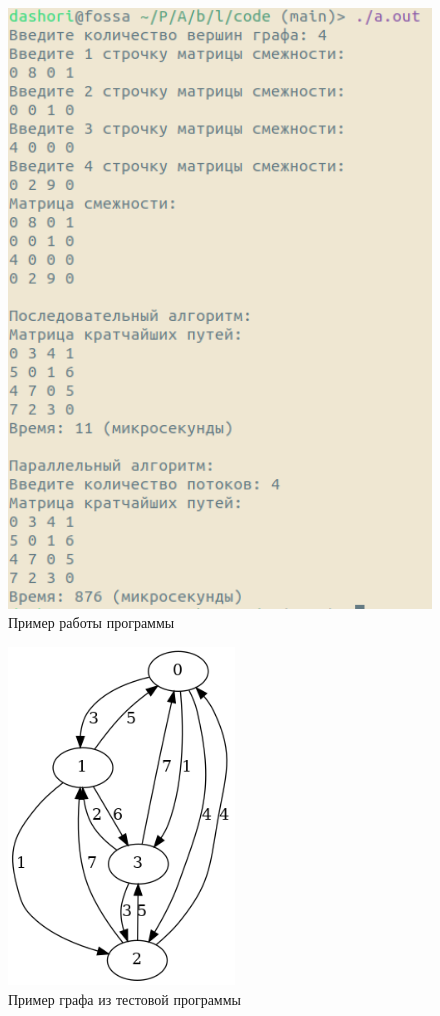 \begin{figure}[H]
	\centering
	\includegraphics[width=130mm]{images/example}
	\caption{Пример работы программы}
	\label{img:example}
\end{figure}
\begin{figure}[H]
	\centering
	\includegraphics[width=60mm]{images/exampleGraph.png}
	\caption{Пример графа из тестовой программы}
	\label{img:exampleGraph}
\end{figure}


